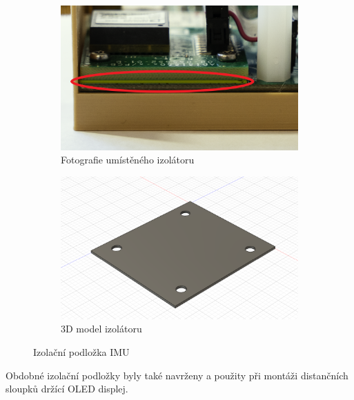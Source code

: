 \begin{figure}
     \centering
     \begin{subfigure}[b]{0.45\textwidth}
         \centering
         \includegraphics[width=\textwidth]{obrazky/isolatorADIS}
         \caption{Fotografie umístěného izolátoru}
       
     \end{subfigure}
     \hfill
     \begin{subfigure}[b]{0.45\textwidth}
         \centering
         \includegraphics[width=\textwidth]{obrazky/ModelIsolatorADIS}
         \caption{3D model izolátoru}
         
     \end{subfigure}
        \caption{Izolační podložka IMU}
        \label{fig:adisIsolator}
\end{figure}

Obdobné izolační podložky byly také navrženy a použity při montáži distančních sloupků držící \ac{OLED} displej.

